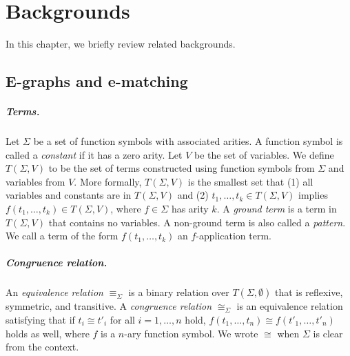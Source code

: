 \chapter{Backgrounds}
\label{sec:background}

In this chapter, we briefly review related backgrounds.

\section{E-graphs and e-matching}

\paragraph{Terms.}
Let $\Sigma$ be a set of function symbols with associated arities. 
A function symbol is called a \textit{constant} if it has a zero arity. 
Let $V$ be the set of variables. We define $T(\Sigma, V)$ to be the set of terms constructed using function symbols from $\Sigma$ and variables from $V$. 
More formally, $T(\Sigma, V)$ is the smallest set that (1) all variables and constants are in $T(\Sigma,V)$ and (2) $t_1,\dots,t_k\in T(\Sigma,V)$ implies $f(t_1,\dots,t_k)\in T(\Sigma,V)$, where $f\in \Sigma$ has arity $k$. 
A \textit{ground term} is a term in $T(\Sigma,V)$ that contains no variables. A non-ground term is also called a \textit{pattern}. We call a term of the form $f(t_1,\ldots,t_k)$ an $f$-application term.

\paragraph{Congruence relation.}
An \textit{equivalence relation} $\equiv_\Sigma$ is a binary relation over $T(\Sigma,\emptyset)$ that is reflexive, symmetric, and transitive. A \textit{congruence relation} $\cong_\Sigma$ is an equivalence relation satisfying that if $t_i\cong t'_i$ for all $i=1,\dots,n$ hold, $f(t_1,\dots,t_n)\cong f(t'_1,\dots,t'_n)$ holds as well, where $f$ is a $n$-ary function symbol. We wrote $\cong$ when $\Sigma$ is clear from the context.


